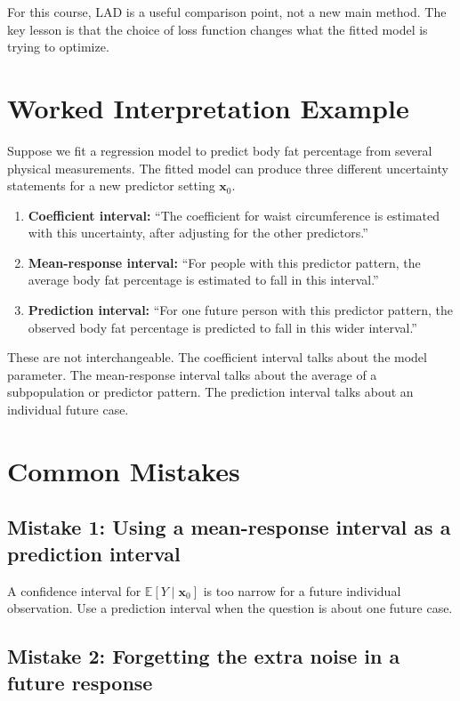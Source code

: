 For this course, LAD is a useful comparison point, not a new main method.  The key lesson is that the choice of loss function changes what the fitted model is trying to optimize.

\section{Worked Interpretation Example}

Suppose we fit a regression model to predict body fat percentage from several physical measurements.  The fitted model can produce three different uncertainty statements for a new predictor setting \(\mathbf{x}_0\).

\begin{enumerate}
  \item \textbf{Coefficient interval:} ``The coefficient for waist circumference is estimated with this uncertainty, after adjusting for the other predictors.''
  \item \textbf{Mean-response interval:} ``For people with this predictor pattern, the average body fat percentage is estimated to fall in this interval.''
  \item \textbf{Prediction interval:} ``For one future person with this predictor pattern, the observed body fat percentage is predicted to fall in this wider interval.''
\end{enumerate}

These are not interchangeable.  The coefficient interval talks about the model parameter.  The mean-response interval talks about the average of a subpopulation or predictor pattern.  The prediction interval talks about an individual future case.

\section{Common Mistakes}

\subsection*{Mistake 1: Using a mean-response interval as a prediction interval}

A confidence interval for \(\mathbb{E}[Y\mid\mathbf{x}_0]\) is too narrow for a future individual observation.  Use a prediction interval when the question is about one future case.

\subsection*{Mistake 2: Forgetting the extra noise in a future response}

